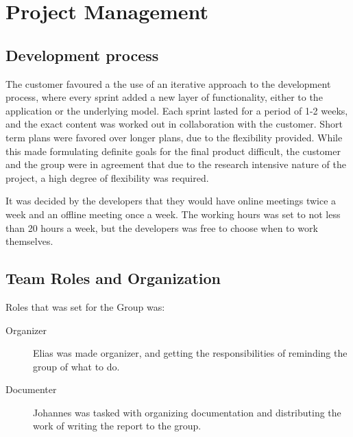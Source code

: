 \chapter{Project Management}
\section{Development process}

The customer favoured a the use of an iterative approach to the development process, where every sprint added a new layer of functionality, either to the application or the underlying model. Each sprint lasted for a period of 1-2 weeks, and the exact content was worked out in collaboration with the customer. Short term plans were favored over longer plans, due to the flexibility provided. While this made formulating definite goals for the final product difficult, the customer and the group were in agreement that due to the research intensive nature of the project, a high degree of flexibility was required. 

It was decided by the developers that they would have online meetings twice a week and an offline meeting once a week. 
The working hours was set to not less than 20 hours a week, but the developers was free to choose when to work themselves.

\section{Team Roles and Organization}
Roles that was set for the Group was:
\begin{description}

\item[Organizer] Elias was made organizer, and getting the responsibilities of reminding the group of what to do.
\item[Documenter] Johannes was tasked with organizing documentation and distributing the work of writing the report to the group. 
\end{description}
 
